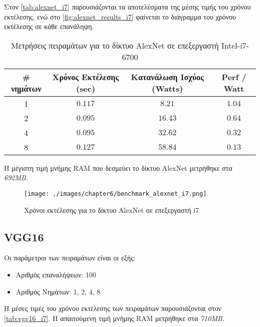 Στον \autoref{tab:alexnet_i7} παρουσιάζονται τα αποτελέσματα της μέσης τιμής
του χρόνου εκτέλεσης, ενώ στο \autoref{fig:alexnet_results_i7} φαίνεται
το διάγραμμα του χρόνου εκτέλεσης σε κάθε επανάληψη.

\begin{table}[H]
  \begin{center}
    \caption{Μετρήσεις πειραμάτων για το δίκτυο AlexNet σε επεξεργαστή Intel-i7-6700}
    \label{tab:alexnet_i7}
    \begin{tabular}{ | c | c | c | c | }
      \hline
      \rowcolor{Gray}
      \# νημάτων & Χρόνος Εκτέλεσης (sec) & Κατανάλωση Ισχύος (Watts) & Perf / Watt \\
      \hline
      1 & $0.117$ & $8.21$ & $1.04$ \\
      2 & $0.095$ & $16.43$ & $0.64$ \\
      4 & $0.095$ & $32.62$ & $0.32$ \\
      8 & $0.127$ & $58.84$ & $0.13$ \\
      \hline
    \end{tabular}
  \end{center}
\end{table}

Η μέγιστη τιμή μνήμης RAM που δεσμεύει το δίκτυο AlexNet μετρήθηκε στα \emph{692MB}.
\newpage

\begin{figure}[H]
  \centering
  \texttt{[image: ./images/chapter6/benchmark\_alexnet\_i7.png]}
  \caption[Χρόνoι εκτέλεσης για το δίκτυο AlexNet σε επεξεργαστή i7]{Χρόνοι εκτέλεσης για το δίκτυο AlexNet σε επεξεργαστή i7}
  \label{fig:alexnet_results_i7}
\end{figure}




\subsection{VGG16}

Οι παράμετροι των πειραμάτων είναι οι εξής:
\begin{itemize}
  \item{Αριθμός επαναλήψεων: 100}
  \item{Αριθμός Νημάτων: 1, 2, 4, 8}
\end{itemize}

Η μέσες τιμές του χρόνου εκτέλεσης των πειραμάτων παρουσιάζονται στον \autoref{tab:vgg16_i7}.
Η απαιτούμενη τιμή μνήμης RAM μετρήθηκε στα \emph{710MB}.

